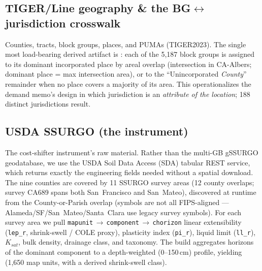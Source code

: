 \documentclass[11pt]{article}
\newcommand{\NBG}{5,187}              %
\newcommand{\NJURIS}{188}           %
\newcommand{\NMAPUNITS}{1,650}        %
\newcommand{\NSURVEY}{11}            %
\begin{document}
\subsection{TIGER/Line geography \& the BG$\leftrightarrow$jurisdiction crosswalk}
Counties, tracts, block groups, places, and PUMAs (TIGER2023). The single most
load-bearing derived artifact is :
each of the \NBG{} block groups is assigned to its dominant incorporated place by
areal overlap (intersection in CA-Albers; dominant place = max intersection
area), or to the ``Unincorporated \emph{County}'' remainder when no place covers
a majority of its area. This operationalizes the demand memo's design in which
jurisdiction is an \emph{attribute of the location}; \NJURIS{} distinct
jurisdictions result.

\begin{table}[H]\centering\footnotesize\setlength{\tabcolsep}{6pt}
\caption{Geography by county (block groups, jurisdictions, unincorporated BGs).}
\label{tab:geo}
\end{table}

\subsection{USDA SSURGO (the instrument)}
The cost-shifter instrument's raw material. Rather than the multi-GB gSSURGO
geodatabase, we use the USDA Soil Data Access (SDA) tabular REST service, which
returns exactly the engineering fields needed without a spatial download. The
nine counties are covered by \NSURVEY{} SSURGO survey areas (12 county overlaps;
survey CA689 spans both San~Francisco and San~Mateo), discovered at runtime from
the County-or-Parish overlap (symbols are not all FIPS-aligned ---
Alameda/SF/San~Mateo/Santa~Clara use legacy survey symbols). For each survey
area we pull \texttt{mapunit}$\,\to\,$\texttt{component}$\,\to\,$\texttt{chorizon}
linear extensibility (\texttt{lep\_r}, shrink-swell / COLE proxy), plasticity
index (\texttt{pi\_r}), liquid limit (\texttt{ll\_r}), $K_{sat}$, bulk density,
drainage class, and taxonomy. The build aggregates horizons of the dominant
component to a depth-weighted (0--150\,cm) profile, yielding
 (\NMAPUNITS{} map
units, with a derived shrink-swell class).
\end{document}
